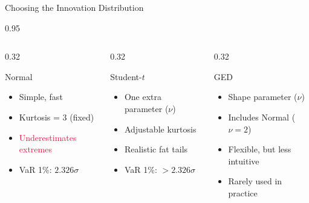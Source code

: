\documentclass[9pt, aspectratio=169, t]{beamer}
\begin{document}
\begin{frame}{Choosing the Innovation Distribution}
    \begin{cminipage}{0.95\textwidth}
        \small
        \begin{columns}[T]
            \begin{column}{0.32\textwidth}
                \begin{block}{\centering Normal}
                    \begin{itemize}\setlength{\itemsep}{0pt}
                        \item Simple, fast
                        \item Kurtosis = 3 (fixed)
                        \item \textcolor{Crimson}{Underestimates extremes}
                        \item VaR 1\%: $2.326\sigma$
                    \end{itemize}
                \end{block}
            \end{column}
            \begin{column}{0.32\textwidth}
                \begin{block}{\centering Student-$t$}
                    \begin{itemize}\setlength{\itemsep}{0pt}
                        \item One extra parameter ($\nu$)
                        \item Adjustable kurtosis
                        \item \textcolor{Forest}{Realistic fat tails}
                        \item VaR 1\%: $> 2.326\sigma$
                    \end{itemize}
                \end{block}
            \end{column}
            \begin{column}{0.32\textwidth}
                \begin{block}{\centering GED}
                    \begin{itemize}\setlength{\itemsep}{0pt}
                        \item Shape parameter ($\nu$)
                        \item Includes Normal ($\nu=2$)
                        \item Flexible, but less intuitive
                        \item Rarely used in practice

\end{itemize}
\end{block}
\end{column}
\end{columns}
\end{cminipage}
\end{frame}
\end{document}
